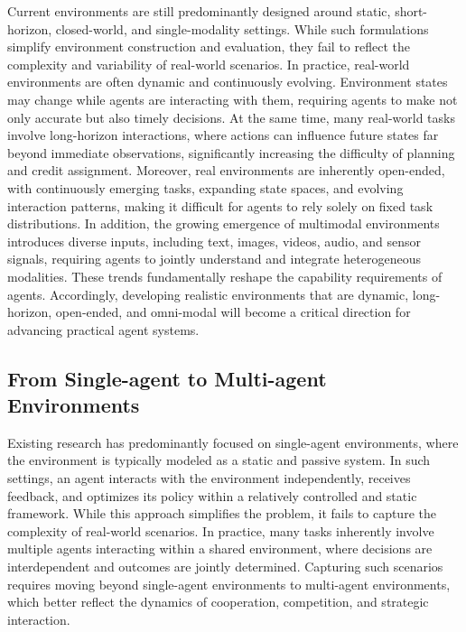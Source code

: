 \documentclass{llmxive}
\begin{document}
Current environments are still predominantly designed around static, short-horizon, closed-world, and single-modality settings.
While such formulations simplify environment construction and evaluation, they fail to reflect the complexity and variability of real-world scenarios.
In practice, real-world environments are often dynamic and continuously evolving.
Environment states may change while agents are interacting with them, requiring agents to make not only accurate but also timely decisions.
At the same time, many real-world tasks involve long-horizon interactions, where actions can influence future states far beyond immediate observations, significantly increasing the difficulty of planning and credit assignment.
Moreover, real environments are inherently open-ended, with continuously emerging tasks, expanding state spaces, and evolving interaction patterns, making it difficult for agents to rely solely on fixed task distributions.
In addition, the growing emergence of multimodal environments introduces diverse inputs, including text, images, videos, audio, and sensor signals, requiring agents to jointly understand and integrate heterogeneous modalities.
These trends fundamentally reshape the capability requirements of agents.
Accordingly, developing realistic environments that are dynamic, long-horizon, open-ended, and omni-modal will become a critical direction for advancing practical agent systems.

\subsection{From Single-agent to Multi-agent Environments}

Existing research has predominantly focused on single-agent environments, where the environment is typically modeled as a static and passive system. 
In such settings, an agent interacts with the environment independently, receives feedback, and optimizes its policy within a relatively controlled and static framework.
While this approach simplifies the problem, it fails to capture the complexity of real-world scenarios.
In practice, many tasks inherently involve multiple agents interacting within a shared environment, where decisions are interdependent and outcomes are jointly determined. Capturing such scenarios requires moving beyond single-agent environments to multi-agent environments, which better reflect the dynamics of cooperation, competition, and strategic interaction.
\end{document}
